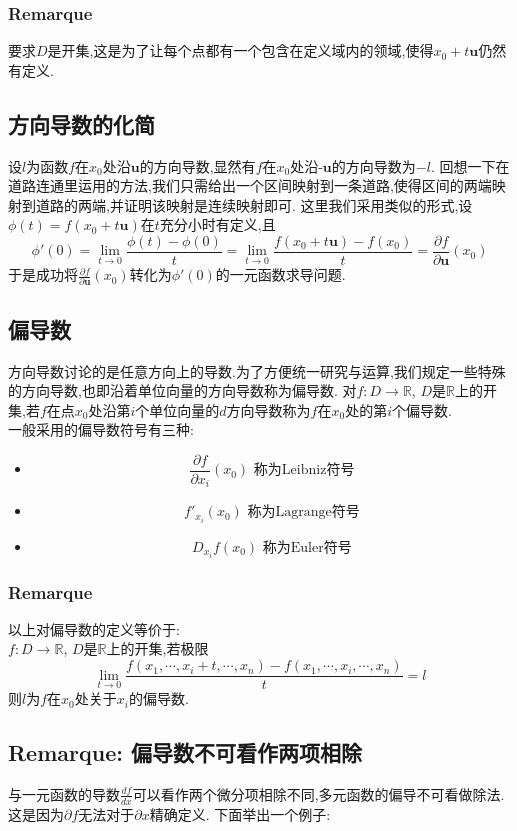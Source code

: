 \documentclass[12pt, a4paper, oneside]{ctexbook}
\begin{document}
  \subsubsection{Remarque}
  要求$D$是开集,这是为了让每个点都有一个包含在定义域内的领域,使得$x_0+t\textbf{u}$仍然有定义.
  \subsection{方向导数的化简}
  设$l$为函数$f$在$x_0$处沿$\textbf{u}$的方向导数,显然有$f$在$x_0$处沿$\textbf{-u}$的方向导数为$-l$.
  回想一下在道路连通里运用的方法,我们只需给出一个区间映射到一条道路,使得区间的两端映射到道路的两端,并证明该映射是连续映射即可.
  这里我们采用类似的形式,设$\phi(t)=f(x_0+t\textbf{u})$在$t$充分小时有定义,且
  $$
  \phi'(0)=\lim_{t \to 0} \frac{\phi(t)-\phi(0)}{t} =\lim_{t \to 0}\frac{f(x_0+t\textbf{u})-f(x_0)}{t}=\frac{\partial f}{\partial \textbf{u}}(x_0)
  $$
  于是成功将$\frac{\partial f}{\partial \textbf{u}}(x_0)$转化为$\phi'(0)$的一元函数求导问题.
  \subsection{偏导数}
  方向导数讨论的是任意方向上的导数.为了方便统一研究与运算,我们规定一些特殊的方向导数,也即沿着单位向量的方向导数称为偏导数.
  对$f:D\rightarrow \mathbb{R}$, $D$是$\mathbb{R}$上的开集,若$f$在点$x_0$处沿第$i$个单位向量的$d$方向导数称为$f$在$x_0$处的第$i$个偏导数.\\
  一般采用的偏导数符号有三种:
  \begin{itemize}
    \item $$\frac{\partial f}{\partial x_i}(x_0)\text{ 称为Leibniz符号}$$ 
    \item $$f'_{x_i}(x_0) \text{ 称为Lagrange符号}$$
    \item $$D_{x_i}f(x_0) \text{ 称为Euler符号}$$
  \end{itemize}
  \subsubsection{Remarque}
  以上对偏导数的定义等价于:\\
  
  $f:D\rightarrow \mathbb{R}$, $D$是$\mathbb{R}$上的开集,若极限
  $$
  \lim_{t \to 0}\frac{f(x_1,\cdots,x_i+t,\cdots,x_n)-f(x_1,\cdots,x_i,\cdots,x_n)}{t}=l
  $$
  则$l$为$f$在$x_0$处关于$x_i$的偏导数.
  \subsection{Remarque: 偏导数不可看作两项相除}
  与一元函数的导数$\frac{d f}{d x}$可以看作两个微分项相除不同,多元函数的偏导不可看做除法.这是因为$\partial f$无法对于$\partial x$精确定义.
  下面举出一个例子:
\end{document}
